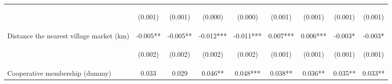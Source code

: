 \begin{center}
\begin{tabular}{lcccccccc}
\vspace{4pt} & \begin{footnotesize}(0.001)\end{footnotesize} & \begin{footnotesize}(0.001)\end{footnotesize} & \begin{footnotesize}(0.000)\end{footnotesize} & \begin{footnotesize}(0.000)\end{footnotesize} & \begin{footnotesize}(0.001)\end{footnotesize} & \begin{footnotesize}(0.001)\end{footnotesize} & \begin{footnotesize}(0.001)\end{footnotesize} & \begin{footnotesize}(0.001)\end{footnotesize} \\
Distance the nearest village market (km) & -0.005** & -0.005** & -0.012*** & -0.011*** & 0.007*** & 0.006*** & -0.003* & -0.003* \\
\vspace{4pt} & \begin{footnotesize}(0.002)\end{footnotesize} & \begin{footnotesize}(0.002)\end{footnotesize} & \begin{footnotesize}(0.002)\end{footnotesize} & \begin{footnotesize}(0.002)\end{footnotesize} & \begin{footnotesize}(0.001)\end{footnotesize} & \begin{footnotesize}(0.001)\end{footnotesize} & \begin{footnotesize}(0.001)\end{footnotesize} & \begin{footnotesize}(0.001)\end{footnotesize} \\
Cooperative membership (dummy) & 0.033 & 0.029 & 0.046** & 0.048*** & 0.038** & 0.036** & 0.035** & 0.033** \\

\end{tabular}
\end{center}
